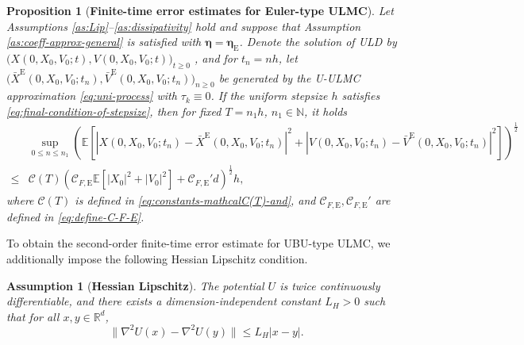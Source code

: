\documentclass[12pt]{article}
\newenvironment{redtext}
  {\color{black}\ignorespaces}
  {\ignorespacesafterend}
\numberwithin{equation}{section}
\newcommand{\E}{\mathbb{E}}
\newtheorem{prop}{Proposition}[section]
\newtheorem{assumption}{Assumption}[section]
\begin{document}
\begin{redtext}


\begin{redtext}

\begin{prop}[\textbf{Finite-time error estimates for Euler-type ULMC}]
\label{prop:finite-error-Euler}
Let Assumptions \ref{as:Lip}--\ref{as:dissipativity} hold and suppose that Assumption \ref{as:coeff-approx-general} is satisfied with $\boldsymbol{\eta}= \boldsymbol{\eta}_\mathrm{E}$.
Denote the solution of ULD by
\(
\big(
X(0,X_0,V_0;t),
V(0,X_0,V_0;t)
\big)_{t\geq0}
\)
, and for $t_n=nh$, let
\(
\big(
\bar X^{\mathrm E}(0,X_0,V_0;t_n),
\bar V^{\mathrm E}(0,X_0,V_0;t_n)
\big)_{n\geq0}
\)
be generated by the U-ULMC approximation \eqref{eq:uni-process} with $\tau_k \equiv 0$.
If the uniform stepsize $h$ satisfies \eqref{eq:final-condition-of-stepsize},
then for fixed $T=n_1h$, \(n_1\in\mathbb N\), it holds
\begin{align}
&
\sup_{0\leq n\leq n_1}
\left(
\E
\left[
\left|
X(0,X_0,V_0;t_n)
-
\bar X^{\mathrm E}(0,X_0,V_0;t_n)
\right|^2
+
\left|
V(0,X_0,V_0;t_n)
-
\bar V^{\mathrm E}(0,X_0,V_0;t_n)
\right|^2
\right]
\right)^{\frac12}
\nonumber\\
\leq&
\mathcal C(T)
\left(
\mathcal C_{F,\mathrm E}
\E
\left[
|X_0|^2+|V_0|^2
\right]
+
\mathcal C_{F,\mathrm E}'d
\right)^{\frac12}
h,
\label{eq:finite-time-error-Euler}
\end{align}
where $\mathcal C(T)$ is defined in
\eqref{eq:constants-mathcalC(T)-and}, and $\mathcal C_{F,\mathrm E}, \mathcal C_{F,\mathrm E}'$ are defined in \eqref{eq:define-C-F-E}.
\end{prop}

\end{redtext}

To obtain the second-order finite-time error estimate for UBU-type ULMC, we additionally impose the following Hessian Lipschitz condition.

\begin{assumption}[\textbf{Hessian Lipschitz}]\label{as:Hessian-lip}
The potential $U$ is twice continuously differentiable, and there exists a dimension-independent constant $L_H > 0$ such that for all $x,y \in \mathbb{R}^d$,
\[
\|\nabla^2 U(x) - \nabla^2 U(y)\| \le L_H |x - y|.
\]
\end{assumption}
\end{redtext}
\end{document}
